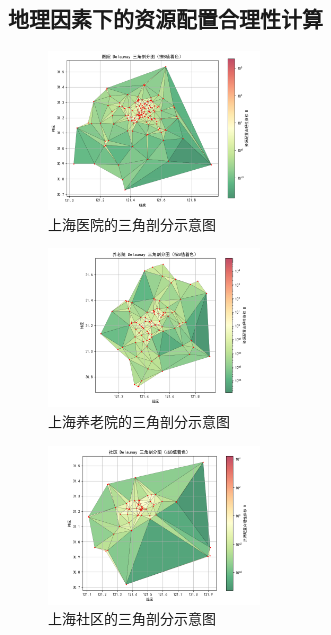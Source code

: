 \documentclass[12pt,a4paper]{article}
\begin{document}
\subsection{地理因素下的资源配置合理性计算}

\begin{figure}[H] %
\centering %
\includegraphics[width=0.5\textwidth]{images/hospital.png} %
\caption{上海医院的三角剖分示意图} %
\label{Fig.main2} %
\end{figure}

\begin{figure}[H] %
\centering %
\includegraphics[width=0.5\textwidth]{images/nursing_home.png} %
\caption{上海养老院的三角剖分示意图} %
\label{Fig.main2} %
\end{figure}

\begin{figure}[H] %
\centering %
\includegraphics[width=0.5\textwidth]{images/community.png} %
\caption{上海社区的三角剖分示意图} %
\label{Fig.main2} %
\end{figure}
\end{document}
